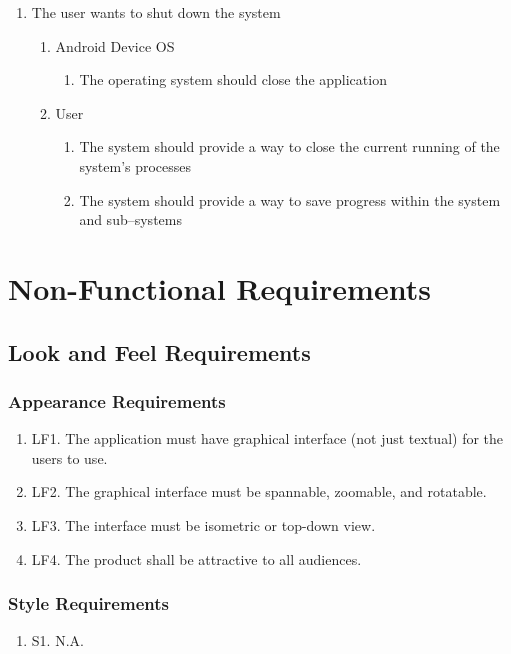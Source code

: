 \documentclass[]{article}
\begin{document}
\begin{enumerate}
\begin{enumerate}
\begin{enumerate}
			\end{enumerate}
	\end{enumerate}
	\item The user wants to shut down the system
	\begin{enumerate}
		\item Android Device OS
			\begin{enumerate}
				\item The operating system should close the application
			\end{enumerate}
		\item User
			\begin{enumerate}
				\item The system should provide a way to close the current running of the system's processes
				\item The system should provide a way to save progress within the system and sub--systems
			\end{enumerate}
	\end{enumerate}
\end{enumerate}

\section{Non-Functional Requirements}
\subsection{Look and Feel Requirements}
\subsubsection{Appearance Requirements}
\begin{enumerate}
\item LF1. The application must have graphical interface (not just textual) for the users to use.
\item LF2. The graphical interface must be spannable, zoomable, and rotatable.
\item LF3. The interface must be isometric or top-down view.
\item LF4. The product shall be attractive to all audiences. 
\end{enumerate}

\subsubsection{Style Requirements}
\begin{enumerate}
	\item S1. N.A.
\end{enumerate}
\end{document}
